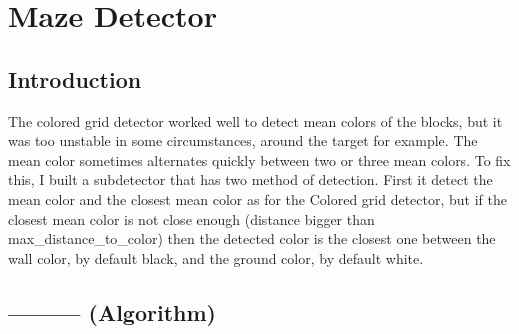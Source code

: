 \section{Maze Detector}

\subsection{Introduction}

The colored grid detector worked well to detect mean colors of the blocks, 
but it was too unstable in some circumstances, around the target for 
example. The mean color sometimes alternates quickly between two or 
three mean colors. To fix this, I built a subdetector that has two 
method of detection. First it detect the mean color and the closest 
mean color as for the Colored grid detector, but if the closest mean 
color is not close enough (distance bigger than max\_distance\_to\_color) 
then the detected color is the closest one between the wall color, by 
default black, and the ground color, by default white.   

\subsection{--------- (Algorithm)}


